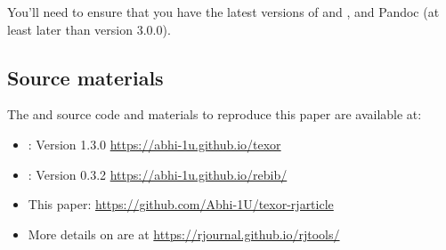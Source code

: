 You'll need to ensure that you have the latest versions of  and , and Pandoc (at least later than version 3.0.0).

\subsection*{Source materials}\label{source-materials}

The  and  source code and materials to reproduce this paper are available at:

\begin{itemize}
\tightlist
\item
  : Version 1.3.0 \url{https://abhi-1u.github.io/texor}
\item
  : Version 0.3.2 \url{https://abhi-1u.github.io/rebib/}
\item
  This paper: \url{https://github.com/Abhi-1U/texor-rjarticle}
\item
  More details on  are at \url{https://rjournal.github.io/rjtools/}
\end{itemize}



\address{%
Abhishek Ulayil\\
Institute of Actuaries of India (student)\\%
Mumbai, India\\
%
%
\textit{ORCiD: \href{https://orcid.org/0009-0000-6935-8690}{0009-0000-6935-8690}}\\%
\href{mailto:abhishek.ulayil.m@gmail.com}{\nolinkurl{abhishek.ulayil.m@gmail.com}}%
}

\address{%
Mitch O'Hara-Wild\\
Monash University\\%
Melbourne, Australia\\
%
%
\textit{ORCiD: \href{https://orcid.org/0000-0001-6729-7695}{0000-0001-6729-7695}}\\%
\href{mailto:mail@mitchelloharawild.com}{\nolinkurl{mail@mitchelloharawild.com}}%
}

\address{%
Christophe Dervieux\\
Posit PBC\\%
Paris, France\\
%
%
\textit{ORCiD: \href{https://orcid.org/0000-0003-4474-2498}{0000-0003-4474-2498}}\\%
\href{mailto:christophe.dervieux@gmail.com}{\nolinkurl{christophe.dervieux@gmail.com}}%
}

